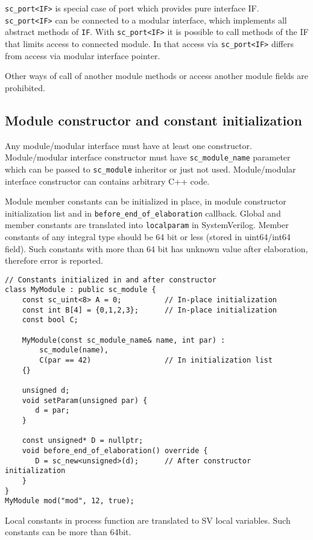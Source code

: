 {\tt sc\_port<IF>} is special case of port which provides pure interface IF. {\tt sc\_port<IF>} can be connected to a modular interface, which implements all abstract methods of {\tt IF}. With {\tt sc\_port<IF>} it is possible to call methods of the IF that limits access to connected module. In that access via {\tt sc\_port<IF>} differs from access via modular interface pointer.

Other ways of call of another module methods or access another module fields are prohibited. 


\subsection{Module constructor and constant initialization}

Any module/modular interface must have at least one constructor. Module/modular interface constructor must have {\tt sc\_module\_name} parameter which can be passed to {\tt sc\_module} inheritor or just not used. Module/modular interface constructor can contains arbitrary C++ code. 

Module member constants can be initialized in place, in module constructor initialization list and in {\tt before\_end\_of\_elaboration} callback. Global and member constants are translated into {\tt localparam} in SystemVerilog. 
Member constants of any integral type should be 64 bit or less (stored in uint64/int64 field). Such constants with more than 64 bit has unknown value after 
elaboration, therefore error is reported.

\begin{lstlisting}[style=mycpp]
// Constants initialized in and after constructor
class MyModule : public sc_module {
    const sc_uint<8> A = 0;          // In-place initialization
    const int B[4] = {0,1,2,3};      // In-place initialization
    const bool C;       
    
    MyModule(const sc_module_name& name, int par) :
        sc_module(name), 
        C(par == 42)                 // In initialization list
    {}
    
    unsigned d;
    void setParam(unsigned par) {
       d = par;
    }
    
    const unsigned* D = nullptr;
    void before_end_of_elaboration() override {
       D = sc_new<unsigned>(d);	     // After constructor initialization
    }
}
MyModule mod("mod", 12, true);
\end{lstlisting}

Local constants in process function are translated to SV local variables. Such constants can be more than 64bit.

